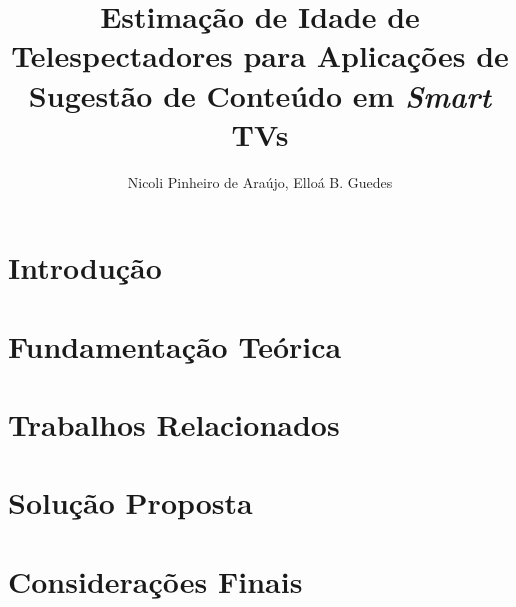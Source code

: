 \documentclass[12pt]{article}
\title{Estimação de Idade de Telespectadores para Aplicações de Sugestão de Conteúdo em \emph{Smart} TVs}
\author{Nicoli Pinheiro de Araújo, Elloá B. Guedes}
\begin{document}

\maketitle



\section{Introdução}\label{sec:intro}


\section{Fundamentação Teórica}\label{sec:fund_teorica}


\section{Trabalhos Relacionados}\label{sec:trab_relac}


\section{Solução Proposta}\label{sec:solucao_proposta}


\section{Considerações Finais}\label{sec:consid_finais}




\end{document}
